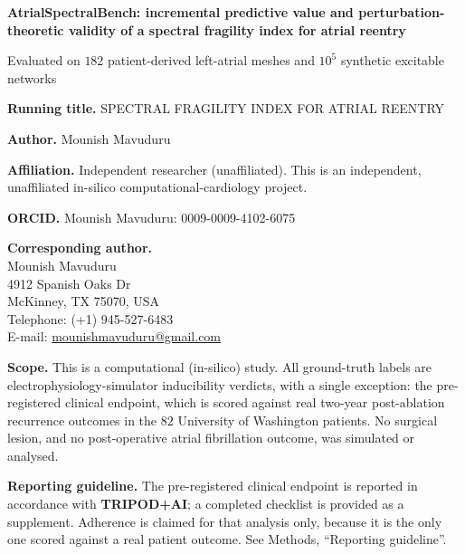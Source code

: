 \documentclass[11pt]{article}
\theoremstyle{definition}
\begin{document}
\thispagestyle{empty}

\begin{center}
{\Large\bfseries AtrialSpectralBench: incremental predictive value and
perturbation-theoretic validity of a spectral fragility index for atrial
reentry\par}
\vspace{6pt}
{\large Evaluated on $182$ patient-derived left-atrial meshes and $10^{5}$
synthetic excitable networks\par}
\end{center}

\vspace{0.7em}
\noindent\textbf{Running title.} SPECTRAL FRAGILITY INDEX FOR ATRIAL REENTRY

\vspace{0.5em}
\noindent\textbf{Author.} Mounish Mavuduru

\smallskip
\noindent\textbf{Affiliation.} Independent researcher (unaffiliated). This is an
independent, unaffiliated in-silico computational-cardiology project.

\smallskip
\noindent\textbf{ORCID.} Mounish Mavuduru: 0009-0009-4102-6075

\vspace{0.5em}
\noindent\textbf{Corresponding author.}\\
Mounish Mavuduru\\
4912 Spanish Oaks Dr\\
McKinney, TX 75070, USA\\
Telephone: (+1) 945-527-6483\\
E-mail: \href{mailto:mounishmavuduru@gmail.com}{mounishmavuduru@gmail.com}

\vspace{0.7em}
\noindent\textbf{Scope.} This is a computational (in-silico) study. All
ground-truth labels are electrophysiology-simulator inducibility verdicts, with a
single exception: the pre-registered clinical endpoint, which is scored against
real two-year post-ablation recurrence outcomes in the $82$ University of
Washington patients. No surgical lesion, and no post-operative atrial
fibrillation outcome, was simulated or analysed.

\smallskip
\noindent\textbf{Reporting guideline.} The pre-registered clinical endpoint is
reported in accordance with \textbf{TRIPOD+AI}; a completed checklist is provided
as a supplement. Adherence is claimed for that analysis only, because it is the
only one scored against a real patient outcome. See Methods, ``Reporting
guideline''.
\end{document}

